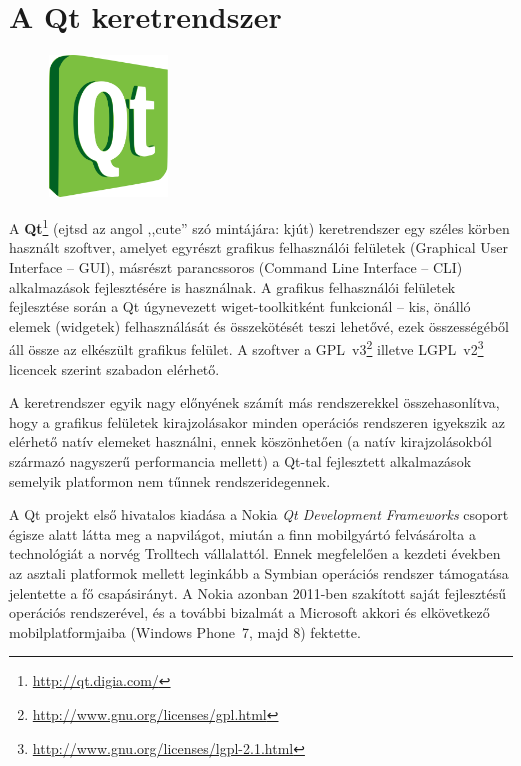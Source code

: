 \section{A Qt keretrendszer}\label{sect:qt}

\begin{figure}
  \vspace{-20pt}
  \begin{center}
    \includegraphics[width=0.28\textwidth]{figures/qt_logo.png}
  \end{center}
  \vspace{-10pt}
\end{figure}

A \textbf{Qt}\footnote{\url{http://qt.digia.com/}} (ejtsd az angol ,,cute'' szó mintájára: kjút) keretrendszer egy széles körben használt szoftver, amelyet egyrészt grafikus felhasználói felületek (Graphical User Interface -- GUI), másrészt parancssoros (Command Line Interface -- CLI) alkalmazások fejlesztésére is használnak. A grafikus felhasználói felületek fejlesztése során a Qt úgynevezett wiget-toolkitként funkcionál -- kis, önálló elemek (widgetek) felhasználását és összekötését teszi lehetővé, ezek összességéből áll össze az elkészült grafikus felület. A szoftver a  GPL~v3\footnote{\url{http://www.gnu.org/licenses/gpl.html}} illetve LGPL~v2\footnote{\url{http://www.gnu.org/licenses/lgpl-2.1.html}} licencek szerint szabadon elérhető. \cite{qt_wiki}

A keretrendszer egyik nagy előnyének számít más rendszerekkel összehasonlítva, hogy a grafikus felületek kirajzolásakor minden operációs rendszeren igyekszik az elérhető natív elemeket használni, ennek köszönhetően (a natív kirajzolásokból származó nagyszerű performancia mellett) a Qt-tal fejlesztett alkalmazások semelyik platformon nem tűnnek rendszeridegennek.

\bigskip

A Qt projekt első hivatalos kiadása a Nokia \emph{Qt Development Frameworks} csoport égisze alatt látta meg a napvilágot, miután a finn mobilgyártó felvásárolta a technológiát a norvég Trolltech vállalattól. Ennek megfelelően a kezdeti években az asztali platformok mellett leginkább a Symbian operációs rendszer támogatása jelentette a fő csapásirányt. A Nokia azonban 2011-ben szakított saját fejlesztésű operációs rendszerével, és a további bizalmát a Microsoft akkori és elkövetkező mobilplatformjaiba (Windows Phone~7, majd 8) fektette.

